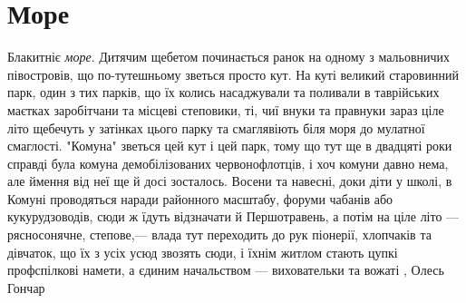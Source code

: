  
 
 
 
 
\chapter{Море}

Блакитніє \emph{море}. Дитячим щебетом починається ранок на одному з мальовничих
півостровів, що по-тутешньому зветься просто кут. На куті великий старовинний
парк, один з тих парків, що їх колись насаджували та поливали в таврійських
маєтках заробітчани та місцеві степовики, ті, чиї внуки та правнуки зараз ціле
літо щебечуть у затінках цього парку та смаглявіють біля моря до мулатної
смаглості. "Комуна" зветься цей кут і цей парк, тому що тут ще в двадцяті роки
справді була комуна демобілізованих червонофлотців, і хоч комуни давно нема,
але ймення від неї ще й досі зосталось. Восени та навесні, доки діти у школі, в
Комуні проводяться наради районного масштабу, форуми чабанів або
кукурудзоводів, сюди ж їдуть відзначати й Першотравень, а потім на ціле літо —
рясносонячне, степове,— влада тут переходить до рук піонерії, хлопчаків та
дівчаток, що їх з усіх усюд звозять сюди, і їхнім житлом стають цупкі
профспілкові намети, а єдиним начальством — виховательки та вожаті
, Олесь Гончар
